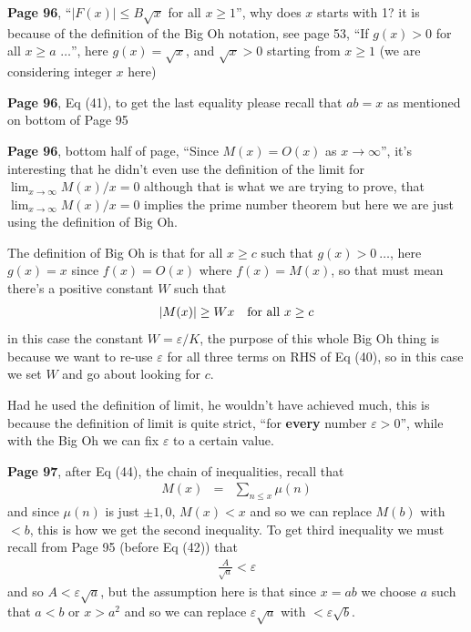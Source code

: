 \documentclass[aps,preprint,preprintnumbers,nofootinbib,showpacs,prd]{revtex4-1}
\newcommand{\nbea}{\begin{eqnarray*}}
\newcommand{\neea}{\end{eqnarray*}}
\begin{document}
{\bf Page 96}, ``$|F(x)| \le B\sqrt{x}$ for all $x\ge 1$'', why does $x$ starts with 1? it is because of the definition of the Big Oh notation, see page 53, ``If $g(x) > 0$ for all $x\ge a$ $\ldots$'', here $g(x) = \sqrt{x}$, and $\sqrt{x} > 0$ starting from $x \ge 1$ (we are considering integer $x$ here)

{\bf Page 96}, Eq (41), to get the last equality please recall that $ab = x$ as mentioned on bottom of Page 95

{\bf Page 96}, bottom half of page, ``Since $M(x) = O(x)$ as $x\to\infty$'', it's interesting that he didn't even use the definition of the limit for $\lim_{x\to\infty} M(x)/x = 0$ although that is what we are trying to prove, that $\lim_{x\to\infty} M(x)/x = 0$ implies the prime number theorem but here we are just using the definition of Big Oh.

The definition of Big Oh is that for all $x\ge c$ such that $g(x) > 0~\ldots$, here $g(x) = x$ since $f(x) = O(x)$ where $f(x) = M(x)$, so that must mean there's a positive constant $W$ such that
%
\nbea
|M(x)| \ge Wx ~~~{\rm for~all~} x \ge c
\neea
%
in this case the constant $W = \varepsilon/K$, the purpose of this whole Big Oh thing is because we want to re-use $\varepsilon$ for all three terms on RHS of Eq (40), so in this case we set $W$ and go about looking for $c$.

Had he used the definition of limit, he wouldn't have achieved much, this is because the definition of limit is quite strict, ``for {\bf every} number $\varepsilon>0$'', while with the Big Oh we can fix $\varepsilon$ to a certain value.
 
{\bf Page 97}, after Eq (44), the chain of inequalities, recall that 
%
\nbea
M(x) & = & \sum_{n\le x}\mu(n)
\neea
%
and since $\mu(n)$ is just $\pm 1, 0$, $M(x) < x$ and so we can replace $M(b)$ with $< b$, this is how we get the second inequality. To get third inequality we must recall from Page 95 (before Eq (42)) that
%
\nbea
\frac{A}{\sqrt{a}} < \varepsilon
\neea
%
and so $A < \varepsilon\sqrt{a}$, but the assumption here is that since $x=ab$ we choose $a$ such that $a < b$ or $x > a^2$ and so we can replace $\varepsilon\sqrt{a}$ with $<\varepsilon\sqrt{b}$.
\end{document}

